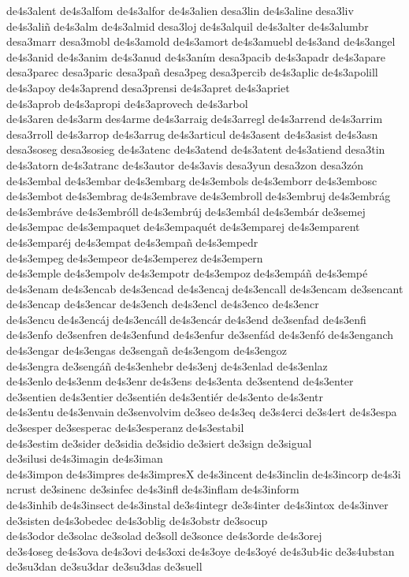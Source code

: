 de4s3alent 
de4s3alfom 
de4s3alfor 
de4s3alien desa3lin 
de4s3aline desa3liv 
de4s3aliñ de4s3alm 
de4s3almid desa3loj de4s3alquil 
de4s3alter de4s3alumbr 	desa3marr 	desa3mobl 
de4s3amold 
de4s3amort de4s3amuebl de4s3and 
de4s3angel 	de4s3anid 	de4s3anim 	de4s3anud 
de4s3aním 
desa3pacib 
de4s3apadr 
de4s3apare 
desa3parec 
desa3paric 	desa3pañ desa3peg desa3percib 
de4s3aplic de4s3apolill 	de4s3apoy de4s3aprend desa3prensi 
de4s3apret de4s3apriet 
de4s3aprob de4s3apropi 
de4s3aprovech 
de4s3arbol 	de4s3aren de4s3arm des4arme de4s3arraig de4s3arregl de4s3arrend 
de4s3arrim 
desa3rroll 
de4s3arrop 
de4s3arrug de4s3articul 
de4s3asent 
de4s3asist de4s3asn 
desa3soseg desa3sosieg 
de4s3atenc 
de4s3atend 
de4s3atent de4s3atiend desa3tin 
de4s3atorn de4s3atranc 
de4s3autor 	de4s3avis desa3yun desa3zon 	desa3zón 
de4s3embal 
de4s3embar de4s3embarg de4s3embols de4s3emborr de4s3embosc 
de4s3embot de4s3embrag de4s3embrave de4s3embroll de4s3embruj de4s3embrág 
de4s3embráve 
de4s3embróll de4s3embrúj de4s3embál de4s3embár de3semej 
de4s3empac 
de4s3empaquet de4s3empaquét de4s3emparej 
de4s3emparent 
de4s3emparéj 
de4s3empat de4s3empañ de4s3empedr 
de4s3empeg de4s3empeor de4s3emperez de4s3empern 
de4s3emple de4s3empolv de4s3empotr 
de4s3empoz de4s3empáñ 
de4s3empé 	de4s3enam 
de4s3encab 
de4s3encad 
de4s3encaj de4s3encall 
de4s3encam 
de3sencant 
de4s3encap 
de4s3encar 	de4s3ench 	de4s3encl 	de4s3enco 	de4s3encr 	de4s3encu de4s3encáj de4s3encáll de4s3encár de4s3end 	de3senfad 	de4s3enfi 	de4s3enfo 
de3senfren de4s3enfund 
de4s3enfur 
de3senfád 
de4s3enfó de4s3enganch 
de4s3engar 
de4s3engas 
de3sengañ 
de4s3engom 
de4s3engoz 
de4s3engra de3sengáñ de4s3enhebr de4s3enj 
de4s3enlad 
de4s3enlaz 	de4s3enlo de4s3enm de4s3enr de4s3ens 	de4s3enta 
de3sentend 
de4s3enter 
de3sentien de4s3entier de3sentién de4s3entiér 	de4s3ento 	de4s3entr 	de4s3entu de4s3envain de3senvolvim de3seo de4s3eq 	de3s4erci de3s4ert 	de4s3espa 	de3sesper de3sesperac 
de4s3esperanz de4s3estabil 
de4s3estim de3sider de3sidia de3sidio de3siert de3sign 	de3sigual 	de3silusi de4s3imagin 	de4s3iman 
de4s3impon de4s3impres de4s3impresX de4s3incent de4s3inclin de4s3incorp de4s3incrust 	de3sinenc 	de3sinfec 	de4s3infl de4s3inflam de4s3inform 
de4s3inhib de4s3insect de4s3instal de3s4integr 
de3s4inter 
de4s3intox 
de4s3inver 	de3sisten de4s3obedec 
de4s3oblig 
de4s3obstr de3socup 	de4s3odor de3solac de3solad de3soll de3sonce 	de4s3orde 	de4s3orej 	de3s4oseg de4s3ova de4s3ovi de4s3oxi de4s3oye 	de4s3oyé 
de4s3ub4ic de3s4ubstan 	de3su3dan 	de3su3dar 	de3su3das de3suell 
